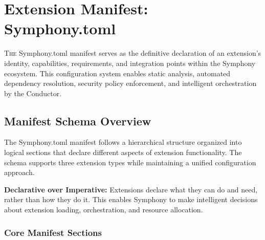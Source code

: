 
\section{Extension Manifest: Symphony.toml}
\label{sec:extension-manifest}

\lettrine{T}{he} Symphony.toml manifest serves as the definitive declaration of an extension's identity, capabilities, requirements, and integration points within the Symphony ecosystem. This configuration system enables static analysis, automated dependency resolution, security policy enforcement, and intelligent orchestration by the Conductor.

\subsection{Manifest Schema Overview}
\label{subsec:manifest-schema-overview}

The Symphony.toml manifest follows a hierarchical structure organized into logical sections that declare different aspects of extension functionality. The schema supports three extension types while maintaining a unified configuration approach.

\begin{infobox}[title=Manifest Design Philosophy]
\textbf{Declarative over Imperative:} Extensions declare what they can do and need, rather than how they do it. This enables Symphony to make intelligent decisions about extension loading, orchestration, and resource allocation.
\end{infobox}

\subsubsection{Core Manifest Sections}
\label{subsubsec:core-manifest-sections}

